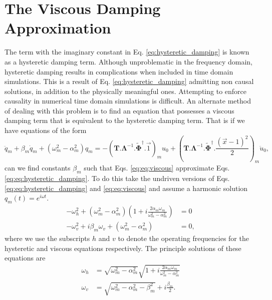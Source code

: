 \documentclass[superscriptaddress, onecolumn, prl]{revtex4}
\begin{document}
\section{The Viscous Damping Approximation}
The term with the imaginary constant in Eq. \ref{eq:hysteretic_damping} is known as a hysteretic damping term. Although unproblematic in the frequency domain, hysteretic damping results in complications when included in time domain simulations. This is a result of Eq. \ref{eq:hysteretic_damping} admitting non causal solutions, in addition to the physically meaningful ones. Attempting to enforce causality in numerical time domain simulations is difficult. An alternate method of dealing with this problem is to find an equation that possesses a viscous damping term that is equivalent to the hysteretic damping term. That is if we have equations of the form
\begin{equation}
\label{eq:viscous}
\ddot{q}_m + \beta_m \dot{q}_m +(\omega_m^2 - \alpha_m^2) q_m = -(\boldsymbol{T}.\boldsymbol{\Lambda}^{-1}.\widetilde{\boldsymbol{\Phi}}^\dagger.\vec{1})_m u_0 + (\boldsymbol{T}.\boldsymbol{\Lambda}^{-1}.\widetilde{\boldsymbol{\Phi}}^\dagger.\frac{(\vec{x}-1)^2}{2})_m \ddot{u}_0,
\end{equation}
can we find constants $\beta_m$ such that Eqs. \ref{eq:eq:viscous} approximate Eqs. \ref{eq:eq:hysteretic_damping}. To do this take the undriven versions of Eqs. \ref{eq:eq:hysteretic_damping} and \ref{eq:eq:viscous} and assume a harmonic solution $q_m(t) = e^{i \omega t}$.
\begin{equation}
\begin{split}
- \omega_h^2 + (\omega_m^2 - \alpha_m^2) \left( 1 +  i \frac{2 \alpha_m \omega_m}{\omega_m^2 - \alpha_m^2} \right) &= 0 \\
- \omega_v^2 + i \beta_m \omega_v + (\omega_m^2 - \alpha_m^2) & = 0,
\end{split}
\end{equation}
where we use the subscripts $h$ and $v$ to denote the operating frequencies for the hysteretic and viscous equations respectively. The principle solutions of these equations are 
\begin{equation}
\begin{split}
\label{eq:operating_frequencies}
\omega_h &= \sqrt{\omega_m^2 - \alpha_m^2} \sqrt{1 +  i \frac{2 \alpha_m \omega_m}{\omega_m^2 - \alpha_m^2} } \\
\omega_v &= \sqrt{\omega_m^2 - \alpha_m^2 - \beta_m^2} + i \frac{\beta_m}{2}.
\end{split}
\end{equation}
\end{document}
